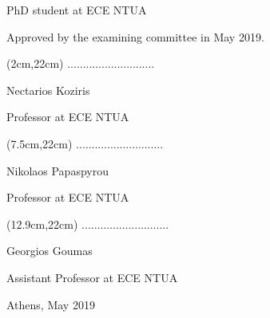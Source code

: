 \begin{mdseries}
\begin{textblock*}{140cm}
PhD student at ECE NTUA
\end{textblock*}
\begingroup
\hfill\break\hfill\break\hfill\break\hfill\break\hfill\break\hfill\break\hfill\break\hfill\break
Approved by the examining committee in May 2019.
\endgroup
\hfill\break\hfill\break\hfill\break

\begin{textblock*}{140cm}(2cm,22cm)
............................

Nectarios Koziris

Professor at ECE NTUA

\end{textblock*}

\begin{textblock*}{140cm}(7.5cm,22cm)
............................

Nikolaos Papaspyrou

Professor at ECE NTUA
\end{textblock*}

\begin{textblock*}{140cm}(12.9cm,22cm)
............................

Georgios Goumas

Assistant Professor at ECE NTUA
\end{textblock*}

\hfill\break\hfill\break\hfill\break\hfill\break\hfill\break\hfill\break

\begin{center}
Athens, May 2019
\end{center}

\end{mdseries}
\endgroup

